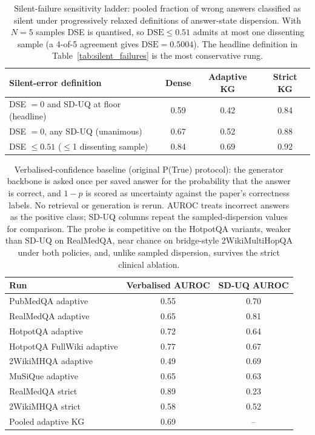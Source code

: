 \begin{table}[t]
\centering
\small
\caption{Silent-failure sensitivity ladder: pooled fraction of wrong answers
classified as silent under progressively relaxed definitions of answer-state
dispersion.
With $N=5$ samples DSE is quantised, so $\mathrm{DSE} \leq 0.51$ admits at
most one dissenting sample (a 4-of-5 agreement gives
$\mathrm{DSE}=0.5004$).
The headline definition in Table~\ref{tab:silent_failures} is the most
conservative rung.
\label{tab:silent_sensitivity}}
\setlength{\tabcolsep}{4pt}
\begin{tabular}{@{}lccc@{}}
\toprule
Silent-error definition & Dense & Adaptive KG & Strict KG \\
\midrule
DSE $=0$ and SD-UQ at floor (headline) & 0.59 & 0.42 & 0.84 \\
DSE $=0$, any SD-UQ (unanimous)        & 0.67 & 0.52 & 0.88 \\
DSE $\leq 0.51$ ($\leq$1 dissenting sample) & 0.84 & 0.69 & 0.92 \\
\bottomrule
\end{tabular}
\end{table}

\begin{table}[t]
\centering
\small
\caption{Verbalised-confidence baseline (original P(True) protocol): the
generator backbone is asked once per saved answer for the probability that
the answer is correct, and $1-p$ is scored as uncertainty against the
paper's correctness labels.
No retrieval or generation is rerun.
AUROC treats incorrect answers as the positive class; SD-UQ columns repeat
the sampled-dispersion values for comparison.
The probe is competitive on the HotpotQA variants, weaker than SD-UQ on
RealMedQA, near chance on bridge-style 2WikiMultiHopQA under both policies,
and, unlike sampled dispersion, survives the strict clinical ablation.
\label{tab:verbalized_confidence}}
\setlength{\tabcolsep}{4.5pt}
\begin{tabular}{@{}lcc@{}}
\toprule
Run & Verbalised AUROC & SD-UQ AUROC \\
\midrule
PubMedQA adaptive & 0.55 & 0.70 \\
RealMedQA adaptive & 0.65 & 0.81 \\
HotpotQA adaptive & 0.72 & 0.64 \\
HotpotQA FullWiki adaptive & 0.77 & 0.67 \\
2WikiMHQA adaptive & 0.49 & 0.69 \\
MuSiQue adaptive & 0.65 & 0.63 \\
\midrule
RealMedQA strict & 0.89 & 0.23 \\
2WikiMHQA strict & 0.58 & 0.52 \\
\midrule
Pooled adaptive KG & 0.69 & -- \\
\bottomrule
\end{tabular}
\end{table}

